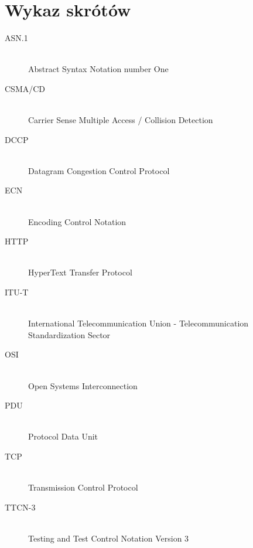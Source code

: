 \documentclass[00-praca-magisterska.tex]{subfiles}
\begin{document}
\chapter{Wykaz skrótów}

\begin{description}
  \item[ASN.1] \hfill \\ Abstract Syntax Notation number One
  \item[CSMA/CD] \hfill \\ Carrier Sense Multiple Access / Collision Detection
  \item[DCCP] \hfill \\ Datagram Congestion Control Protocol
  \item[ECN] \hfill \\ Encoding Control Notation
  \item[HTTP] \hfill \\ HyperText Transfer Protocol
  \item[ITU-T] \hfill \\ International Telecommunication Union - Telecommunication Standardization Sector
  \item[OSI] \hfill \\ Open Systems Interconnection
  \item[PDU] \hfill \\ Protocol Data Unit
  \item[TCP] \hfill \\ Transmission Control Protocol
  \item[TTCN-3] \hfill \\ Testing and Test Control Notation Version 3
\end{description}
\end{document}
